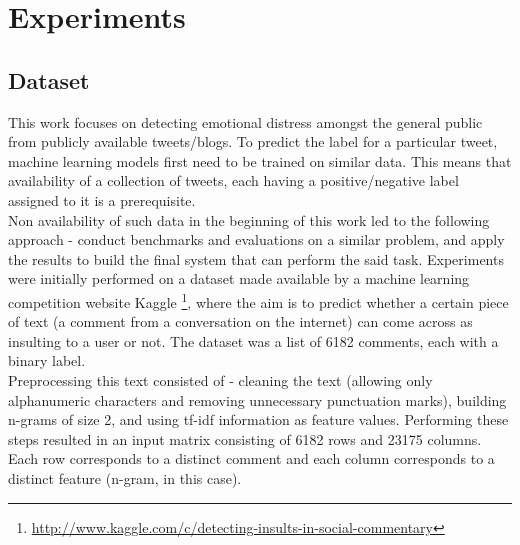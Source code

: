 \chapter{Experiments}
\label{chapter:Experiments}


\section{Dataset}
This work focuses on detecting emotional distress amongst the general public from publicly available tweets/blogs. To predict the label for a particular tweet, machine learning models first need to be trained on similar data. This means that availability of a collection of tweets, each having a positive/negative label assigned to it is a prerequisite.\\

Non availability of such data in the beginning of this work led to the following approach - conduct benchmarks and evaluations on a similar problem, and apply the results to build the final system that can perform the said task. Experiments were initially performed on a dataset made available by a machine learning competition website Kaggle \footnote{\url{http://www.kaggle.com/c/detecting-insults-in-social-commentary}}, where the aim is to predict whether a certain piece of text (a comment from a conversation on the internet) can come across as insulting to a user or not. The dataset was a list of 6182 comments, each with a binary label.\\

Preprocessing this text consisted of - cleaning the text (allowing only alphanumeric characters and removing unnecessary punctuation marks), building n-grams of size 2, and using tf-idf information as feature values. Performing these steps resulted in an input matrix consisting of 6182 rows and 23175 columns. Each row corresponds to a distinct comment and each column corresponds to a distinct feature (n-gram, in this case).\\

